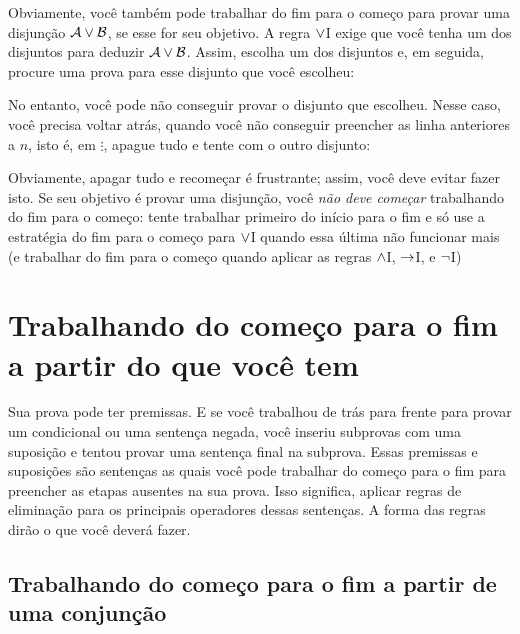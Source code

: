 Obviamente, voc\^e tamb\'em pode trabalhar do fim para o come\c co para provar  uma disjun\c c\~ao $\mathcal{A} \vee \mathcal{B}$, se esse for seu objetivo. A regra
 $\vee$I exige que voc\^e tenha um dos disjuntos para deduzir $\mathcal{A} \vee \mathcal{B}$.
 Assim, escolha um dos disjuntos e,  em seguida,  procure uma prova para esse  disjunto  que voc\^e escolheu:
\begin{fitchproof}
	\ellipsesline
\end{fitchproof}
 No entanto, voc\^e pode n\~ao conseguir provar o  disjunto que escolheu. Nesse caso, voc\^e precisa voltar atr\'as, quando voc\^e n\~ao conseguir preencher as linha anteriores a $n$, isto \'e, em $\vdots$, apague tudo e tente com o outro disjunto:
\begin{fitchproof}
	\ellipsesline 
\end{fitchproof}
 Obviamente, apagar tudo e recome\c car \'e frustrante;  assim, voc\^e deve evitar fazer isto. Se seu objetivo \'e  provar uma disjun\c c\~ao,  voc\^e \emph{n\~ao deve come\c car} trabalhando do fim para o come\c co: tente trabalhar primeiro do in\'icio para o fim e s\'o use a estrat\'egia  do fim para o come\c co para $\vee$I   quando essa \'ultima n\~ao funcionar mais (e trabalhar do fim para o come\c co quando aplicar as regras $\wedge$I, $\rightarrow$I, e $\neg$I) 


\section{Trabalhando do come\c co para o fim a partir do que voc\^e tem}

Sua prova pode ter premissas. E se voc\^e trabalhou de tr\'as para frente para provar um condicional ou uma senten\c ca negada, voc\^e inseriu subprovas com uma suposi\c c\~ao e tentou provar uma senten\c ca final na subprova.  Essas premissas e suposi\c c\~oes s\~ao senten\c cas as quais voc\^e pode trabalhar do come\c co para o fim para preencher as etapas ausentes na sua prova. Isso significa, aplicar regras de  elimina\c c\~ao para os principais operadores dessas senten\c cas. A forma das regras dir\~ao o que voc\^e dever\'a fazer.
 

\subsection*{Trabalhando do come\c co para o fim a partir de uma conjun\c c\~ao}

